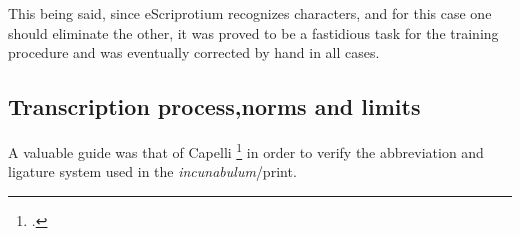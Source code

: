 \documentclass[12pt,twoside]{article}
\begin{document}
This being said, since eScriprotium recognizes characters, and for this case one should eliminate the other, it was proved to be a fastidious task for the training procedure and was eventually corrected by hand in all cases.


\subsection{Transcription process,norms and limits}
A valuable guide was that of Capelli \footcite{cappelli1982elements} in order to verify the abbreviation and ligature system used in the \textit{incunabulum}/print.\\

\begin{landscape}

\pagestyle{empty}

\newcommand{\rum}{\char"A75D\xspace}
\newcommand{\pro}{\char"A753\xspace}
\newcommand{\per}{\char"A751\xspace}
\newcommand{\eced}{\char"0119\xspace}
\newcommand{\quod}{\char"A759\xspace}
\newcommand{\Quod}{\char"A756\xspace}
\newcommand{\ussup}{\char"1DD2\xspace}
\newcommand{\pre}{\char"A751\xspace}
\newcommand{\macron}{\char"0303\xspace}
\newcommand{\ursup}{\char"1DD1\xspace}
\newcommand{\opena}{\char"1DD3\xspace}
\newcommand{\qu}{\char"A757\xspace}
\newcommand{\isup}{\char"0365\xspace}
\newcommand{\etc}{.2c\opena{}.\xspace}
\newcommand{\sm}{\char"1E9C{}m\xspace}



\end{landscape}
\end{document}
